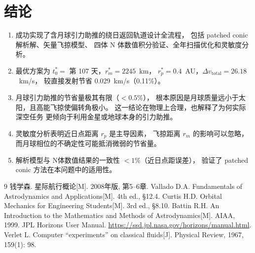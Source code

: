 \documentclass[a4paper,12pt]{article}
\begin{document}
\section{结论}\label{sec:conclusion}

\begin{enumerate}
  \item 成功实现了含月球引力助推的绕日返回轨道设计全流程，
        包括 patched conic 解析解、矢量飞掠模型、
        四体 N 体数值积分验证、全年扫描优化和灵敏度分析。

  \item 最优方案为 $t_0^* = $ 第 107 天，$r_m^* = 2245$~km，
        $r_p^* = 0.4$~AU，$\Delta v_{\mathrm{total}} = 26.18$~km/s，
        较直接发射节省 0.029~km/s（0.11\%）。

  \item 月球引力助推的节省量极其有限（$< 0.5\%$），
        根本原因是月球质量远小于太阳，且高能飞掠使偏转角极小。
        这一结论在物理上合理，也解释了为何实际深空任务
        更倾向于利用金星或地球本身的引力助推。

  \item 灵敏度分析表明近日点距离 $r_p$ 是主导因素，
        飞掠距离 $r_m$ 的影响可以忽略，
        而月球相位的不确定性可能抵消微弱的节省量。

  \item 解析模型与 N体数值结果的一致性 $< 1\%$（近日点距误差），
        验证了 patched conic 方法在本问题中的适用性。
\end{enumerate}


\begin{thebibliography}{9}
   钱学森. 星际航行概论[M]. 2008年版, 第5--6章.
   Vallado D.A. Fundamentals of Astrodynamics and Applications[M]. 4th ed., \S12.4.
   Curtis H.D. Orbital Mechanics for Engineering Students[M]. 3rd ed., \S8.10.
   Battin R.H. An Introduction to the Mathematics and Methods of Astrodynamics[M]. AIAA, 1999.
   JPL Horizons User Manual. \url{https://ssd.jpl.nasa.gov/horizons/manual.html}.
   Verlet L. Computer ``experiments'' on classical fluids[J]. Physical Review, 1967, 159(1): 98.
\end{thebibliography}
\end{document}

